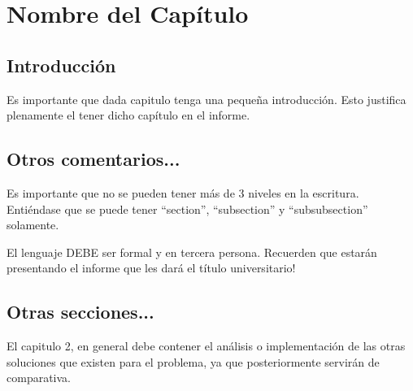 \chapter{Nombre del Capítulo}
\section{Introducción}
Es importante que dada capitulo tenga una pequeña introducción. Esto justifica plenamente el tener dicho capítulo en el informe.

\section{Otros comentarios...}

Es importante que no se pueden tener más de 3 niveles en la escritura. Entiéndase que se puede tener ``section'', ``subsection'' y ``subsubsection'' solamente.

El lenguaje DEBE ser formal y en tercera persona. Recuerden que estarán presentando el informe que les dará el título universitario!

\section{Otras secciones...}

El capitulo 2, en general debe contener el análisis o implementación de las otras soluciones que existen para el problema, ya que posteriormente servirán de comparativa.